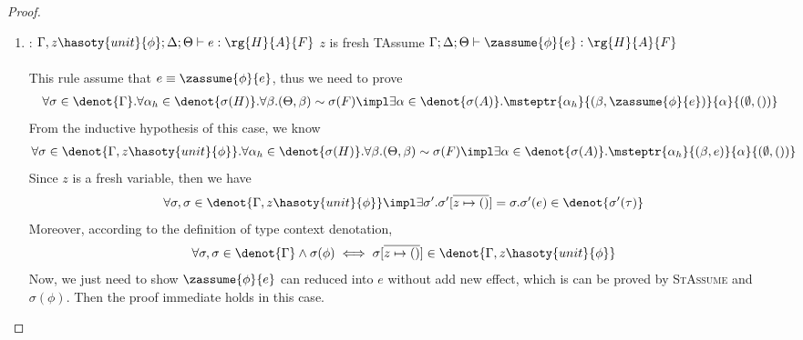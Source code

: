 \begin{proof}
\begin{enumerate}[label=Case]
\item:
{\footnotesize
\mprooftr{50mm}
{$\Gamma, z\hasoty{unit}{\phi};\Delta;\Theta \vdash e : \rg{H}{A}{F}$ \quad $z$ is fresh}
{TAssume}
{$\Gamma;\Delta;\Theta  \vdash \zassume{\phi}{e} : \rg{H}{A}{F}  $}
\ \\ \ \\}
This rule assume that $e \equiv \zassume{\phi}{e}$, thus we need to prove
{\footnotesize\begin{align*}
 \forall \sigma \in \denot{\Gamma}.\forall \alpha_h \in \denot{\sigma(H)}. \forall \beta. (\Theta, \beta) \sim \sigma(F) \impl \exists \alpha \in\denot{\sigma(A)}. \msteptr{\alpha_h}{(\beta, \zassume{\phi}{e})}{\alpha}{(\emptyset, ())}
\end{align*}}\noindent
From the inductive hypothesis of this case, we know
{\footnotesize\begin{align*}
    & \forall \sigma \in \denot{\Gamma, z\hasoty{unit}{\phi}}.\forall \alpha_h \in \denot{\sigma(H)}. \forall \beta. (\Theta, \beta) \sim \sigma(F) \impl \exists \alpha \in\denot{\sigma(A)}. \msteptr{\alpha_h}{(\beta, e)}{\alpha}{(\emptyset, ())}
\end{align*}}\noindent
Since $z$ is a fresh variable, then we have
{\footnotesize\begin{align*}
    &\forall \sigma, \sigma \in \denot{\Gamma, z\hasoty{unit}{\phi}} \impl \exists \sigma'. \sigma'[\overline{z \mapsto ()}] = \sigma. \sigma'(e) \in \denot{\sigma'(\tau)}
\end{align*}}\noindent
Moreover, according to the definition of type context denotation, 
{\footnotesize\begin{align*}
    &\forall \sigma, \sigma \in \denot{\Gamma} \land \sigma(\phi) \iff \sigma[\overline{z \mapsto ()}] \in \denot{\Gamma, z\hasoty{unit}{\phi}}
\end{align*}}\noindent
Now, we just need to show $\zassume{\phi}{e}$ can reduced into $e$ without add new effect, which is can be proved by \textsc{StAssume} and $\sigma(\phi)$. Then the proof immediate holds in this case.


\end{enumerate}
\end{proof}
